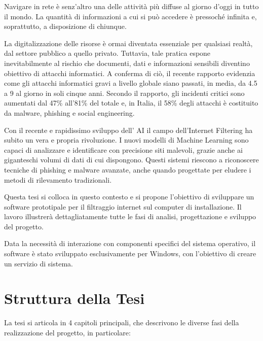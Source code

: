 \documentclass[12pt,a4paper,openright,twoside]{book}
\begin{document}
Navigare in rete è senz'altro una delle attività più diffuse al giorno d'oggi in tutto il mondo.
La quantità di informazioni a cui si può accedere è pressoché infinita e, soprattutto, a disposizione di chiunque.

La digitalizzazione delle risorse è ormai diventata essenziale per qualsiasi realtà, dal settore pubblico a quello privato.
Tuttavia, tale pratica espone inevitabilmente al rischio che documenti,
dati e informazioni sensibili diventino obiettivo di attacchi informatici.
A conferma di ciò, il recente rapporto \cite{clusit2024-sicurezza} evidenzia come gli attacchi informatici gravi a livello globale siano passati,
in media, da 4.5 a 9 al giorno in soli cinque anni.
Secondo il rapporto, gli incidenti critici sono aumentati dal 47\% all'81\% del totale e,
in Italia, il 58\% degli attacchi è costituito da malware, phishing e social engineering.

Con il recente e rapidissimo sviluppo dell' \gls{AI} il campo dell'Internet Filtering ha subito un vera e propria rivoluzione.
I nuovi modelli di Machine Learning sono capaci di analizzare e identificare con precisione siti malevoli,
grazie anche ai giganteschi volumi di dati di cui dispongono.
Questi sistemi riescono a riconoscere tecniche di phishing e malware avanzate, anche quando progettate per eludere i metodi di rilevamento tradizionali.

Questa tesi si colloca in questo contesto e si propone l'obiettivo di sviluppare un software prototipale per il filtraggio internet sul computer di installazione.
Il lavoro illustrerà dettagliatamente tutte le fasi di analisi, progettazione e sviluppo del progetto.

Data la necessità di interazione con componenti specifici del sistema operativo,
il software è stato sviluppato esclusivamente per Windows, con l'obiettivo di creare un servizio di sistema.

\section*{Struttura della Tesi}

La tesi si articola in 4 capitoli principali, che descrivono le diverse fasi della realizzazione del progetto, in particolare:
\end{document}
